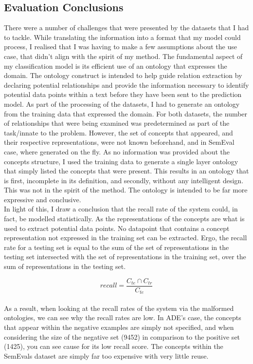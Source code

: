 \documentclass[12pt]{article} %
\begin{document}
\subsection{Evaluation Conclusions}

There were a number of challenges that were presented by the datasets that I had to tackle. While translating the information into a format that my model could process, I realised that I was having to make a few assumptions about the use case, that didn’t align with the spirit of my method. The fundamental aspect of my classification model is its efficient use of an ontology that expresses the domain. The ontology construct is intended to help guide relation extraction by declaring potential relationships and provide the information necessary to identify potential data points within a text before they have been sent to the prediction model. As part of the processing of the datasets, I had to generate an ontology from the training data that expressed the domain. For both datasets, the number of relationships that were being examined was predetermined as part of the task/innate to the problem. However, the set of concepts that appeared, and their respective representations, were not known beforehand, and in SemEval case, where generated on the fly. As no information was provided about the concepts structure, I used the training data to generate a single layer ontology that simply listed the concepts that were present. This results in an ontology that is first, incomplete in its definition, and secondly, without any intelligent design. This was not in the spirit of the method. The ontology is intended to be far more expressive and conclusive.\\

In light of this, I draw a conclusion that the recall rate of the system could, in fact, be modelled statistically. As the representations of the concepts are what is used to extract potential data points. No datapoint that contains a concept representation not expressed in the training set can be extracted. Ergo, the recall rate for a testing set is equal to the sum of the set of representations in the testing set intersected with the set of representations in the training set, over the sum of representations in the testing set.

\begin{equation}
recall = \frac{C_{te} \cap C_{tr}}{C_{te}}
\end{equation}\\

As a result, when looking at the recall rates of the system via the malformed ontologies, we can see why the recall rates are low. In ADE’s case, the concepts that appear within the negative examples are simply not specified, and when considering the size of the negative set (9452) in comparison to the positive set (1425), you can see cause for its low recall score. The concepts within the SemEvals dataset are simply far too expensive with very little reuse. \\
\end{document}
